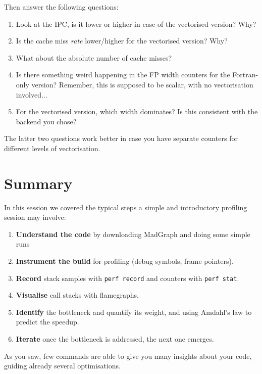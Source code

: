 \documentclass[11pt,a4paper]{article}
\begin{document}
\begin{exercisebox}[Exercise 6]
\bigskip
Then answer the following questions:
\begin{enumerate}[nosep]
    \item Look at the IPC, is it lower or higher in case of the vectorised version? Why?
    \item Is the cache miss \emph{rate} lower/higher for the vectorised version? Why?
    \item What about the absolute number of cache misses?
    \item Is there something weird happening in the FP width counters for the Fortran-only version? Remember, this is supposed to be scalar, with no vectorisation involved...
    \item For the vectorised version, which width dominates? Is this consistent with the backend you chose?
\end{enumerate}
The latter two questions work better in case you have separate counters for different levels of vectorisation.

\vspace{3mm}

\TextField[name=exercise_6_notes, height=3cm, width=\linewidth, multiline, value={...notes...}]{}
\end{exercisebox}

\section{Summary}
\label{sec:summary}

In this session we covered the typical steps a simple and introductory profiling session may involve:
\begin{enumerate}[nosep]
    \item \textbf{Understand the code} by downloading MadGraph and doing some simple runs
    \item \textbf{Instrument the build} for profiling (debug symbols, frame pointers).
    \item \textbf{Record} stack samples with \texttt{perf record} and counters with \texttt{perf stat}.
    \item \textbf{Visualise} call stacks with flamegraphs.
    \item \textbf{Identify} the bottleneck and quantify its weight, and using Amdahl's law to predict the speedup.
    \item \textbf{Iterate} once the bottleneck is addressed, the next one emerges.
\end{enumerate}
As you saw, few commands are able to give you many insights about your code, guiding already several optimisations.
\end{document}
